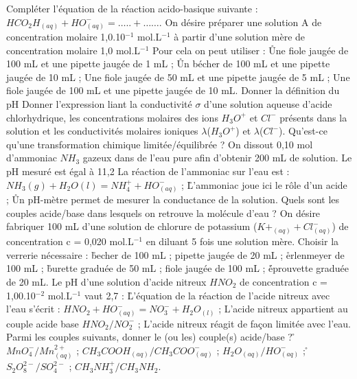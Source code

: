 \q
Compléter l'équation de la réaction acido-basique suivante :
$HCO_2H_{(aq)}+ HO^{-}_{(aq)} =       …..     +  …….$
\q	
On désire préparer une solution A de concentration molaire 1,0.10$^{-1}$ mol.L$^{-1}$ à partir  d'une solution mère de concentration molaire 1,0 mol.L$^{-1}$  Pour cela on peut utiliser :
\r
Une fiole jaugée de 100 mL et une pipette jaugée de 1 mL ;
\r
Un bécher de 100 mL et une pipette jaugée de 10 mL ;
\rv
Une fiole jaugée de 50 mL et une pipette jaugée de 5 mL ;
\rv
Une fiole jaugée de 100 mL et une pipette jaugée de 10 mL.
\q	
 Donner la définition du pH
\q	
 Donner l'expression liant la conductivité $\sigma$ d'une solution aqueuse 
d'acide chlorhydrique, les concentrations molaires des ions $H_3O^+$ et $Cl^{-}$ 
présents dans la solution et les conductivités molaires ioniques  $\lambda$($H_3O^+$) et  $\lambda$($Cl^{-}$).
\q	
  Qu'est-ce qu'une transformation chimique limitée/équilibrée ?
\q
  	On dissout 0,10 mol d'ammoniac $NH_3$ gazeux dans de l'eau pure afin d'obtenir 200 mL de solution.
Le pH mesuré est égal à 11,2
\rv
  La réaction de l'ammoniac sur l'eau est : $NH_3(g) + H_2O(l) = NH_4^+ +  HO^{-}_{(aq)}$ ;
\r
  L'ammoniac joue ici le rôle d'un acide ;
\r
  Un pH-mètre permet de mesurer la conductance de la solution.
\q	
  Quels sont les couples acide/base dans lesquels on retrouve la molécule d'eau   ?
\q	
 On désire fabriquer 100 mL d'une solution de chlorure de potassium ($K+_{(aq)} + Cl^{-}_{(aq)}$) de concentration   c = 0,020 mol.L$^{-1}$ en diluant 5 fois une solution mère. Choisir la verrerie nécessaire :
\r
  becher de 100 mL ;		
\rv
    pipette jaugée de 20 mL ;
\r
  erlenmeyer de 100 mL ;	
\r
  	  burette graduée de 50 mL ;
\rv
  fiole jaugée de 100 mL ; 
\r
              	  éprouvette graduée de 20 mL.
\q
   	Le pH d'une solution d'acide nitreux $HNO_2$ de concentration c = 1,00.10$^{-2}$ mol.L$^{-1}$ vaut 2,7 :
\r  
L'équation de la réaction de l'acide nitreux avec l'eau s'écrit : 
$HNO_2 + HO^{-}_{(aq)}  = NO_3^{-} + H_2O_(l)$ ;
\rv
  L'acide nitreux appartient au couple acide base $HNO_2/NO_2^-$ ;
\rv
  L'acide nitreux réagit de façon limitée avec l'eau.
\q	
   Parmi les couples suivants, donner le (ou les) couple(s) acide/base ?
\r
 	$MnO_4^- / Mn^{2+}_{(aq)}$ ;
\rv
 	$CH_3COOH_{(aq)} / CH_3COO^{-}_{(aq)}$ ;
\rv
 	$H_2O_{(aq)} / HO^{-}_{(aq)}$ ;
\r
 	$S_2O_8^{2-}/ SO_4^{2-}$ ;
\rv
 	$CH_3NH_3^+ / CH_3NH_2$.

